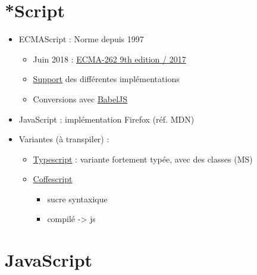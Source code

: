 \hypertarget{script}{%
\section{*Script}\label{script}}

\begin{itemize}
\tightlist
\item
  ECMAScript : Norme depuis 1997

  \begin{itemize}
  \tightlist
  \item
    Juin 2018 :
    \href{https://www.ecma-international.org/publications/standards/Ecma-262.htm}{ECMA-262
    9th edition / 2017}
  \item
    \href{http://kangax.github.io/compat-table/es2016plus/}{Support} des
    différentes implémentations
  \item
    Conversions avec \href{https://babeljs.io/}{BabelJS}
  \end{itemize}
\item
  JavaScript : implémentation Firefox (réf. MDN)
\item
  Variantes (à transpiler) :

  \begin{itemize}
  \tightlist
  \item
    \href{https://www.typescriptlang.org/}{Typescript} : variante
    fortement typée, avec des classes (MS)
  \item
    \href{http://coffeescript.org/}{Coffescript}

    \begin{itemize}
    \tightlist
    \item
      sucre syntaxique
    \item
      compilé -\textgreater{} js
    \end{itemize}
  \end{itemize}
\end{itemize}

\hypertarget{javascript}{%
\section{JavaScript}\label{javascript}}

